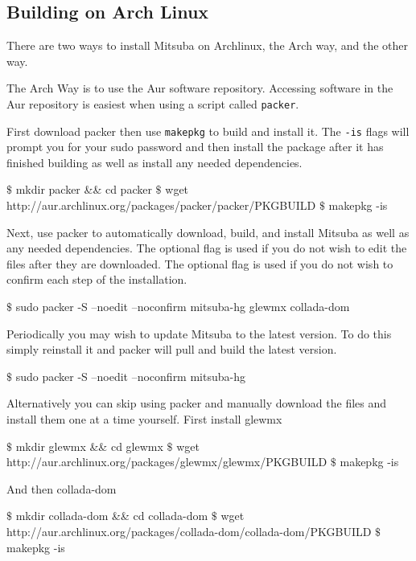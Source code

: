 \subsection{Building on Arch Linux}
There are two ways to install Mitsuba on Archlinux, the Arch way, and the other way.

The Arch Way is to use the Aur software repository. 
Accessing software in the Aur repository is easiest when using a script called \texttt{packer}.

First download packer then use \texttt{makepkg} to build and install it. 
The \texttt{-is} flags will prompt you for your sudo password and then install the package after it has finished building as well as install any needed dependencies.
\begin{shell}
$\text{\$}$ mkdir packer && cd packer
$\text{\$}$ wget http://aur.archlinux.org/packages/packer/packer/PKGBUILD
$\text{\$}$ makepkg -is
\end{shell}

Next, use packer to automatically download, build, and install Mitsuba as well as any needed dependencies.
The optional  flag is used if you do not wish to edit the files after they are downloaded.
The optional  flag is used if you do not wish to confirm each step of the installation. 
\begin{shell}
$\text{\$}$ sudo packer -S --noedit --noconfirm mitsuba-hg glewmx collada-dom
\end{shell}

Periodically you may wish to update Mitsuba to the latest version.
To do this simply reinstall it and packer will pull and build the latest version.
\begin{shell}
$\text{\$}$ sudo packer -S --noedit --noconfirm mitsuba-hg
\end{shell}

Alternatively you can skip using packer and manually download the files and install them one at a time yourself.
First install glewmx
\begin{shell}
$\text{\$}$ mkdir glewmx && cd glewmx
$\text{\$}$ wget http://aur.archlinux.org/packages/glewmx/glewmx/PKGBUILD
$\text{\$}$ makepkg -is
\end{shell}

And then collada-dom
\begin{shell}
$\text{\$}$ mkdir collada-dom && cd collada-dom
$\text{\$}$ wget http://aur.archlinux.org/packages/collada-dom/collada-dom/PKGBUILD
$\text{\$}$ makepkg -is
\end{shell}

